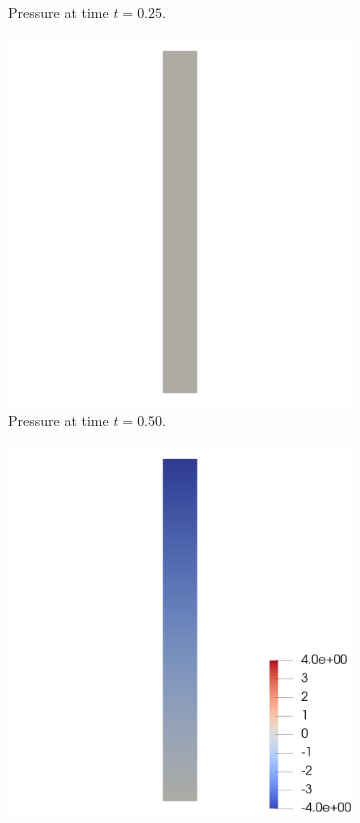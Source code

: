 \documentclass[a4paper,11pt,openright,twoside]{book}
\begin{document}
\begin{figure}[h!]
\begin{subfigure}[b]{0.5\linewidth}
        \centering 
    \caption{Pressure at time $t = 0.25$.} 
    \label{fig4:b} 
    \vspace{4ex}
  \end{subfigure} 
  \begin{subfigure}[b]{0.5\linewidth}
    \centering
    \includegraphics[width=1.2\linewidth]{images/pressure_fixed_050.png} 
        \centering
    \caption{Pressure at time $t = 0.50$.} 
    \label{fig4:c} 
  \end{subfigure}%
  \begin{subfigure}[b]{0.5\linewidth}
    \centering
    \includegraphics[width=1.2\linewidth]{images/pressure_fixed_075.png} 

\end{subfigure}
\end{figure}
\end{document}
